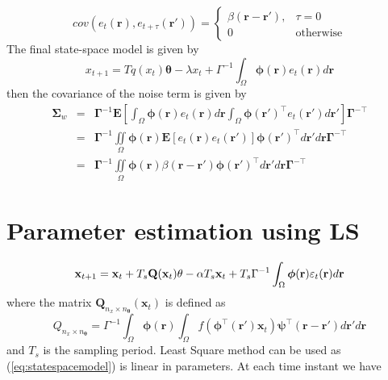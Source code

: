 \documentclass[onecolumn,draftcls]{IEEEtran}
\begin{document}
\begin{equation}
cov(e_t(\mathbf{r}),e_{t+\tau}(\mathbf{r'}))=
\begin{cases}
\beta\left(\mathbf{r}-\mathbf{r'}\right), & \tau=0 \\
0 & \mathrm{otherwise}
\end{cases}
\label{eq:FieldCovariance}
\end{equation}
The final state-space model is given by
\begin{equation}
x_{t + 1} = T q(x_t)\mathbf{\theta} -\lambda x_t + \Gamma^{-1}\int_\Omega  {\boldsymbol{\phi} ( \mathbf{r} )e_t( \mathbf{r} )d\mathbf{r}}
\end{equation}
then the covariance of the noise term is given by
\begin{eqnarray}
\mathbf{\Sigma}_w&=&\mathbf{\Gamma}^{-1}\mathbf E[\int_{\Omega}\boldsymbol{\phi}\left(\mathbf{r}\right)e_t\left(\mathbf{r}\right)d\mathbf{r} \int_{\Omega}\boldsymbol{\phi}\left(\mathbf{r}'\right)^{\top} e_t\left(\mathbf{r}'\right)d\mathbf{r}']\mathbf{\Gamma}^{- \top} \nonumber \\
&=&\mathbf{\Gamma}^{-1}\iint\limits_{\Omega} \boldsymbol{\phi}\left(\mathbf{r}\right) \mathbf E[e_t\left(\mathbf{r}\right)e_t\left(\mathbf{r}'\right)]\boldsymbol{\phi}\left(\mathbf{r}'\right)^{\top}d\mathbf{r}' d\mathbf r\mathbf{\Gamma}^{- \top} \nonumber\\
&=&\mathbf{\Gamma}^{-1}\iint\limits_{\Omega}\boldsymbol{\phi}\left(\mathbf r\right) \beta\left(\mathbf r- \mathbf r' \right)\boldsymbol{\phi}\left(\mathbf r'\right)^{\top}d\mathbf r' d\mathbf r\mathbf{\Gamma}^{- \top} 
\end{eqnarray}

\section{Parameter estimation using LS}
\begin{equation}
 \mathbf x_{t+1}=\mathbf{x}_{t}+T_s \mathbf{Q}(\mathbf{x}_t)\mathbf \mathbf{\theta}-\alpha T_s\mathbf{x}_t+T_s\Gamma^{-1}\int_\Omega\boldsymbol{\phi}(\mathbf r)\varepsilon_t(\mathbf r)d\mathbf r
\label{eq:statespacemodel}
\end{equation}
where the matrix $\mathbf Q_{n_x \times n_{\mathbf{\theta}}}(\mathbf x_t)$ is defined as
\begin{equation}
 Q_{n_x \times n_{\mathbf{\theta}}}=\Gamma^{-1}\int_\Omega\boldsymbol{\phi}(\mathbf r)\int_\Omega f(\boldsymbol{\phi}^\top(\mathbf r')\mathbf x_t)\mathbf{\psi}^\top(\mathbf r-\mathbf r')d\mathbf r'd\mathbf r
\end{equation}
and $T_s$ is the sampling period. Least Square method can be used as (\ref{eq:statespacemodel}) is linear in parameters. At each time instant we have
\end{document}
